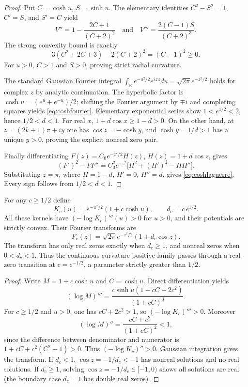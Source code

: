 \begin{proof}
Put $C=\cosh u$, $S=\sinh u$. The elementary identities
$C^2-S^2=1$, $C'=S$, and $S'=C$ yield
\[
V''=1-\frac{2C+1}{(C+2)^2}
\quad\text{and}\quad
V'''=\frac{2(C-1)S}{(C+2)^3}.
\]
The strong convexity bound is exactly
\[
3(C^2+2C+3)-2(C+2)^2
=(C-1)^2\ge0.
\]
For $u>0$, $C>1$ and $S>0$, proving
strict radial curvature.

The standard Gaussian Fourier integral
$\int_{\mathbb R}e^{-u^2/2}e^{izu}du
=\sqrt{2\pi}e^{-z^2/2}$ holds for complex $z$
by analytic continuation.
The hyperbolic factor is
$\cosh u=(e^u+e^{-u})/2$; shifting the Fourier
argument by $\mp i$ and completing squares
yields \eqref{eq:coshfourier}.
Elementary exponential series show
$1<e^{1/2}<2$, hence $1/2<d<1$.
For real $x$, $1+d\cos x\ge1-d>0$.
On the other hand, at
$z=(2k+1)\pi+iy$ one has
$\cos z=-\cosh y$, and
$\cosh y=1/d>1$ has a unique $y>0$,
proving the explicit nonreal zero pair.

Finally differentiating
$F(z)=C_0e^{-z^2/2}H(z)$,
$H(z)=1+d\cos z$, gives
\[
(F')^2-FF''
=C_0^2e^{-z^2}
\bigl[H^2+(H')^2-HH''\bigr].
\]
Substituting $z=\pi$, where
$H=1-d$, $H'=0$, $H''=d$, gives
\eqref{eq:coshlaguerre}. Every sign follows
from $1/2<d<1$.
\end{proof}

\begin{proposition}\label{prop:coshfamily}
For any $c\ge1/2$ define
\[
K_c(u)=e^{-u^2/2}(1+c\cosh u),\qquad
d_c=c\,e^{1/2}.
\]
All these kernels have $(-\log K_c)'''(u)>0$
for $u>0$, and their potentials are
strictly convex. Their Fourier transforms are
\[
F_c(z)=\sqrt{2\pi}e^{-z^2/2}(1+d_c\cos z).
\]
The transform has only real zeros exactly when
$d_c\ge1$, and nonreal zeros when $0<d_c<1$.
Thus the continuous curvature-positive family
passes through a real-zero transition at
$c=e^{-1/2}$, a parameter strictly greater than $1/2$.
\end{proposition}
\begin{proof}
Write $M=1+c\cosh u$ and $C=\cosh u$.
Direct differentiation yields
\[
(\log M)'''=
\frac{c\sinh u(1-cC-2c^2)}
{(1+cC)^3}.
\]
For $c\ge1/2$ and $u>0$, one has
$cC+2c^2>1$, so $(-\log K_c)'''>0$.
Moreover
\[
(\log M)''=
\frac{cC+c^2}{(1+cC)^2}<1,
\]
since the difference between denominator
and numerator is $1+cC+c^2(C^2-1)>0$.
Thus $(-\log K_c)''>0$.
Gaussian integration gives the transform.
If $d_c<1$, $\cos z=-1/d_c<-1$ has
nonreal solutions and no real solutions.
If $d_c\ge1$, solving
$\cos z=-1/d_c\in[-1,0)$ shows all
solutions are real (the boundary case
$d_c=1$ has double real zeros).
\end{proof}

